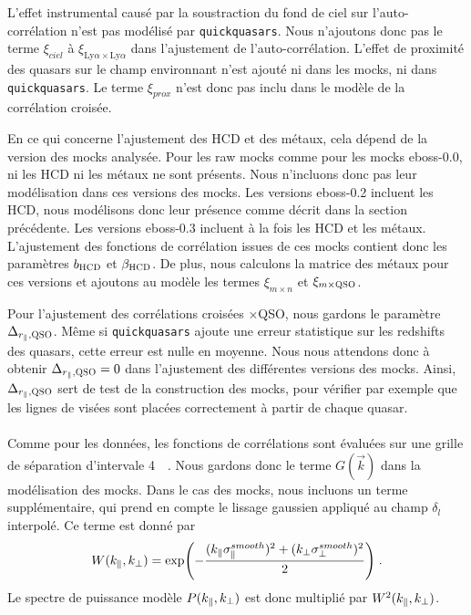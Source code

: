 \documentclass[11pt, twoside, a4paper, openright]{report}
\begin{document}
L'effet instrumental causé par la soustraction du fond de ciel sur l'auto-corrélation n'est pas modélisé par \texttt{quickquasars}. Nous n'ajoutons donc pas le terme $\xi_{ciel}$ à $\xi_{\mathrm{Ly}\alpha\times\mathrm{Ly}\alpha}$ dans l'ajustement de l'auto-corrélation.
L'effet de proximité des quasars sur le champ \lya{} environnant n'est ajouté ni dans les mocks, ni dans \texttt{quickquasars}. Le terme
$\xi_{prox}$ n'est donc pas inclu dans le modèle de la corrélation croisée.

En ce qui concerne l'ajustement des HCD et des métaux, cela dépend de la version des mocks analysée.
Pour les raw mocks comme pour les mocks eboss-0.0, ni les HCD ni les métaux ne sont présents. Nous n'incluons donc pas leur modélisation dans ces versions des mocks.
Les versions eboss-0.2 incluent les HCD, nous modélisons donc leur présence comme décrit dans la section précédente.
Les versions eboss-0.3 incluent à la fois les HCD et les métaux. L'ajustement des fonctions de corrélation issues de ces mocks contient donc les paramètres $b_{\textsc{HCD}}$ et $\beta_{\textsc{HCD}}$. De plus, nous calculons la matrice des métaux pour ces versions et ajoutons au modèle les termes $\xi_{m\times n}$ et $\xi_{m\times \textsc{QSO}}$.

Pour l'ajustement des corrélations croisées \lya{}$\times$QSO, nous gardons le paramètre $\Delta_{r_{\parallel}{}, \textsc{QSO}}$. Même si \texttt{quickquasars} ajoute une erreur statistique sur les redshifts des quasars, cette erreur est nulle en moyenne. Nous nous attendons donc à obtenir $\Delta_{r_{\parallel}{}, \textsc{QSO}} = 0$ dans l'ajustement des différentes versions des mocks. Ainsi, $\Delta_{r_{\parallel}{}, \textsc{QSO}}$ sert de test de la construction des mocks, pour vérifier par exemple que les lignes de visées sont placées correctement à partir de chaque quasar.

\paragraph{}
Comme pour les données, les fonctions de corrélations sont évaluées sur une grille de séparation d'intervale \SI{4}{\perh\Mpc}. Nous gardons donc le terme $G(\vec k)$ dans la modélisation des mocks.
Dans le cas des mocks, nous incluons un terme supplémentaire, qui prend en compte le lissage gaussien appliqué au champ $\delta_l$ interpolé. Ce terme est donné par
\begin{equation}
  W(k_{\parallel}{}, k_{\perp}{}) = \exp(- \frac{(k_{\parallel}{} \sigma^{smooth}_{\parallel})^2 + (k_{\perp}{} \sigma^{smooth}_{\perp})^2}{2}) \; .
\end{equation}
Le spectre de puissance modèle $P(k_{\parallel}{}, k_{\perp}{})$ est donc multiplié par $W^2(k_{\parallel}{}, k_{\perp}{})$.
\end{document}
